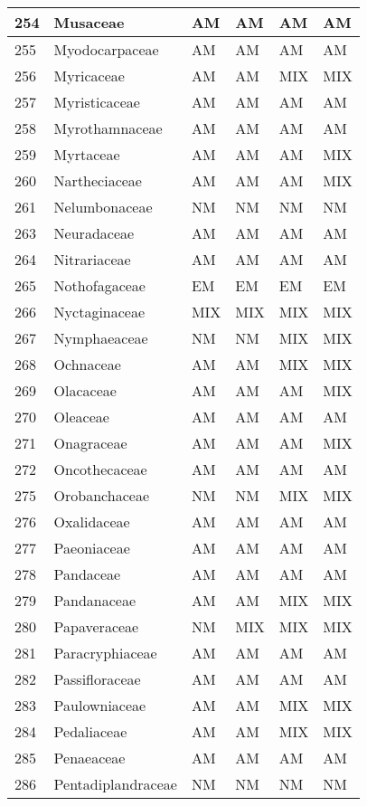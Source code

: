 \documentclass[]{article}
\begin{document}
\begin{longtable}{l|l|l|l|l|l}
\hline
254 & Musaceae & AM & AM & AM & AM\\
\hline
255 & Myodocarpaceae & AM & AM & AM & AM\\
\hline
256 & Myricaceae & AM & AM & MIX & MIX\\
\hline
257 & Myristicaceae & AM & AM & AM & AM\\
\hline
258 & Myrothamnaceae & AM & AM & AM & AM\\
\hline
259 & Myrtaceae & AM & AM & AM & MIX\\
\hline
260 & Nartheciaceae & AM & AM & AM & MIX\\
\hline
261 & Nelumbonaceae & NM & NM & NM & NM\\
\hline
263 & Neuradaceae & AM & AM & AM & AM\\
\hline
264 & Nitrariaceae & AM & AM & AM & AM\\
\hline
265 & Nothofagaceae & EM & EM & EM & EM\\
\hline
266 & Nyctaginaceae & MIX & MIX & MIX & MIX\\
\hline
267 & Nymphaeaceae & NM & NM & MIX & MIX\\
\hline
268 & Ochnaceae & AM & AM & MIX & MIX\\
\hline
269 & Olacaceae & AM & AM & AM & MIX\\
\hline
270 & Oleaceae & AM & AM & AM & AM\\
\hline
271 & Onagraceae & AM & AM & AM & MIX\\
\hline
272 & Oncothecaceae & AM & AM & AM & AM\\
\hline
275 & Orobanchaceae & NM & NM & MIX & MIX\\
\hline
276 & Oxalidaceae & AM & AM & AM & AM\\
\hline
277 & Paeoniaceae & AM & AM & AM & AM\\
\hline
278 & Pandaceae & AM & AM & AM & AM\\
\hline
279 & Pandanaceae & AM & AM & MIX & MIX\\
\hline
280 & Papaveraceae & NM & MIX & MIX & MIX\\
\hline
281 & Paracryphiaceae & AM & AM & AM & AM\\
\hline
282 & Passifloraceae & AM & AM & AM & AM\\
\hline
283 & Paulowniaceae & AM & AM & MIX & MIX\\
\hline
284 & Pedaliaceae & AM & AM & MIX & MIX\\
\hline
285 & Penaeaceae & AM & AM & AM & AM\\
\hline
286 & Pentadiplandraceae & NM & NM & NM & NM\\

\end{longtable}
\end{document}
